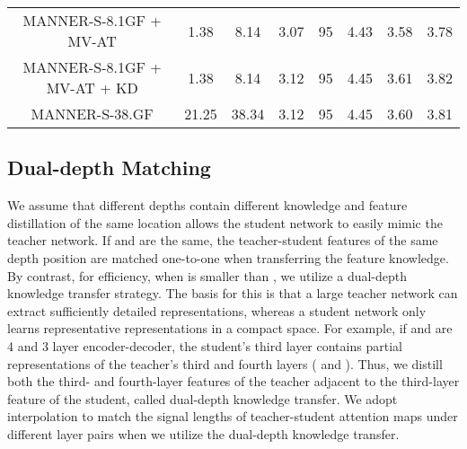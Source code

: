 \documentclass[a4paper]{article}
\begin{document}
\begin{table*}[th]
{\begin{tabular}{c|ccccccc}
{MANNER-S-8.1GF + MV-AT \hspace{0pt plus 1filll}} & 1.38 & 8.14 & 3.07 & 95 & 4.43 & 3.58 & 3.78\\
{MANNER-S-8.1GF + MV-AT + KD \hspace{0pt plus 1filll}} & 1.38 & 8.14 & 3.12 & 95 & 4.45 & 3.61 & 3.82\\
{MANNER-S-38.GF \hspace{0pt plus 1filll}} & 21.25 & 38.34 & 3.12 & 95 & 4.45 & 3.60 & 3.81 \\
\bottomrule
\end{tabular}
}
\end{table*}
\subsection{Dual-depth Matching}
We assume that different depths contain different knowledge and feature distillation of the same location allows the student network to easily mimic the teacher network. If  and  are the same, the teacher-student features of the same depth position are matched one-to-one when transferring the feature knowledge. By contrast, for efficiency, when  is smaller than , we utilize a dual-depth knowledge transfer strategy. The basis for this is that a large teacher network can extract sufficiently detailed representations, whereas a student network only learns representative representations in a compact space. 
For example, if  and  are 4 and 3 layer encoder-decoder, the student's third layer  contains partial representations of the teacher's third and fourth layers ( and ). Thus, we distill both the third- and fourth-layer features of the teacher adjacent to the third-layer feature of the student, called dual-depth knowledge transfer. We adopt interpolation to match the signal lengths of teacher-student attention maps under different layer pairs when we utilize the dual-depth knowledge transfer.
\end{document}
